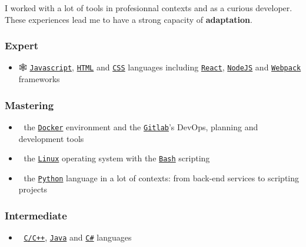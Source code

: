 \documentclass[11pt]{article}
\begin{document}
I worked with a lot of tools in profesionnal contexts and as a curious developer. These experiences lead me to have a strong capacity of \textbf{adaptation}.

\subsubsection{Expert}
\label{sec:orgea89f98}
\begin{itemize}
\item 🕸 \href{https://www.javascript.com/}{\texttt{Javascript}}, \href{https://html.spec.whatwg.org/multipage/}{\texttt{HTML}} and \href{https://www.w3.org/Style/CSS/}{\texttt{CSS}} languages including \href{https://reactjs.org/}{\texttt{React}}, \href{https://nodejs.org}{\texttt{NodeJS}} and \href{https://webpack.js.org/}{\texttt{Webpack}} frameworks
\end{itemize}

\subsubsection{Mastering}
\label{sec:orgacc460e}
\begin{itemize}
\item 🐋 the \href{https://www.docker.com/}{\texttt{Docker}} environment and the \href{https://about.gitlab.com/}{\texttt{Gitlab}}'s DevOps, planning and development tools
\item 🐧 the \href{https://kernel.org/}{\texttt{Linux}} operating system with the \href{https://www.gnu.org/software/bash/}{\texttt{Bash}} scripting
\item 🐍 the \href{https://www.python.org/}{\texttt{Python}} language in a lot of contexts: from back-end services to scripting projects
\end{itemize}

\subsubsection{Intermediate}
\label{sec:org86a53f6}
\begin{itemize}
\item 🤖 \href{https://en.cppreference.com/w/}{\texttt{C/C++}}, \href{https://www.java.com/en/}{\texttt{Java}} and \href{https://dotnet.microsoft.com/en-us/}{\texttt{C\#}} languages
\end{itemize}
\end{document}
